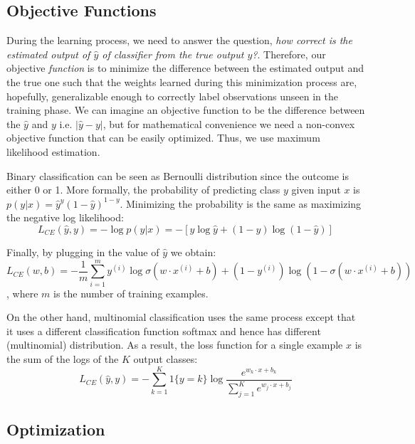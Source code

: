 \subsection{Objective Functions}

During the learning process, we need to answer the question, \emph{how correct is the estimated output of $\hat{y}$ of classifier from the true output $y$?}. Therefore, our objective \emph{function} is to minimize the difference between the estimated output and the true one such that the weights learned during this minimization process are, hopefully,  generalizable enough to correctly label observations unseen in the training phase. We can imagine an objective function to be the difference between the $\hat{y}$ and $y$ i.e. $\left | \hat{y} - y \right |$, but for mathematical convenience we need a non-convex objective function that can be easily optimized. Thus, we use maximum likelihood estimation. 

Binary classification can be seen as Bernoulli distribution since the outcome is either 0 or 1. More formally, the probability of predicting class $y$ given input $x$ is  $p ( y | x ) = \hat { y } ^ { y } ( 1 - \hat { y } ) ^ { 1 - y }$. Minimizing the probability is the same as maximizing the negative log likelihood:
 $$L _ { C E } ( \hat { y } , y ) = - \log p ( y | x ) = - [ y \log \hat { y } + ( 1 - y ) \log ( 1 - \hat { y } ) ]$$

Finally, by plugging in the value of $\hat{y}$ we obtain:
$$ L _ { C E } ( w , b ) = - \frac { 1 } { m } \sum _ { i = 1 } ^ { m } y ^ { ( i ) } \log \sigma \left( w \cdot x ^ { ( i ) } + b \right) + \left( 1 - y ^ { ( i ) } \right) \log \left( 1 - \sigma \left( w \cdot x ^ { ( i ) } + b \right) \right) $$, where $m$ is the number of training examples.

On the other hand, multinomial classification uses the same process except that it uses a different classification function softmax and hence has different (multinomial) distribution. As a result, the loss function for a single example $x$ is the sum of the logs of the $K$ output classes:
$$ L _ { C E } ( \hat { y } , y ) = - \sum _ { k = 1 } ^ { K } 1 \{ y = k \} \log \frac { e ^ { w _ { k } \cdot x + b _ { k } } } { \sum _ { j = 1 } ^ { K } e ^ { w _ { j } \cdot x + b _ { j } } } $$

\subsection{Optimization}

